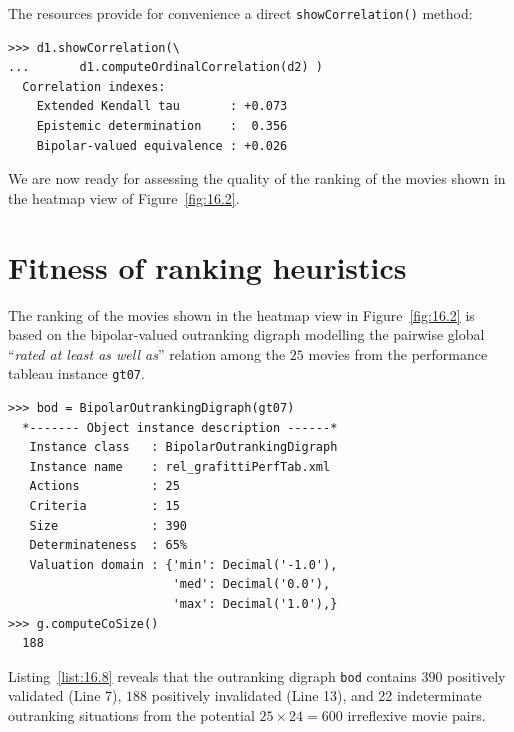 The \Digraph resources provide for convenience a direct \texttt{showCorrela\-tion()} method:
\begin{lstlisting}
>>> d1.showCorrelation(\
...       d1.computeOrdinalCorrelation(d2) )
  Correlation indexes:
    Extended Kendall tau       : +0.073
    Epistemic determination    :  0.356
    Bipolar-valued equivalence : +0.026
\end{lstlisting}

We are now ready for assessing the quality of the \NetFlows ranking of the movies shown in the heatmap view of Figure~\vref{fig:16.2}. 

\section{Fitness of ranking heuristics}
\label{sec:16.3}

The \NetFlows ranking of the movies shown in the heatmap view in Figure~\vref{fig:16.2} is based on the bipolar-valued outranking digraph modelling the pairwise global ``\emph{rated at least as well as}'' relation among the $25$ movies from the performance tableau instance \texttt{gt07}.
\begin{lstlisting}[caption={The bipolar-valued outranking digraph of the star-rated movies},label=list:16.8]
>>> bod = BipolarOutrankingDigraph(gt07)
  *------- Object instance description ------*
   Instance class   : BipolarOutrankingDigraph
   Instance name    : rel_grafittiPerfTab.xml
   Actions          : 25
   Criteria         : 15
   Size             : 390
   Determinateness  : 65%
   Valuation domain : {'min': Decimal('-1.0'),
                       'med': Decimal('0.0'),
                       'max': Decimal('1.0'),}
>>> g.computeCoSize()
  188
\end{lstlisting}
Listing~\vref{list:16.8} reveals that the outranking digraph \texttt{bod} contains $390$ positively validated (Line 7), $188$ positively invalidated (Line 13), and 22 indeterminate outranking situations from the potential $25 \times 24 = 600$ irreflexive movie pairs.

